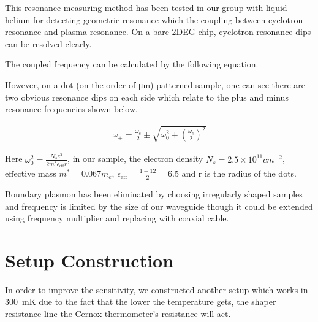 \documentclass[12pt]{ruthesis}
\begin{document}
This resonance measuring method has been tested in our group with liquid helium for detecting geometric resonance which the coupling between cyclotron resonance and plasma resonance. 
On a bare 2DEG chip, cyclotron resonance dips can be resolved clearly.

The coupled frequency can be calculated by the following equation. 


However, on a dot (on the order of \si{\micro\meter}) patterned sample, one can see there are two obvious resonance dips on each side which relate to the plus and minus resonance frequencies shown below.  


\begin{align}
\omega_{\pm}=\frac{\omega_{c}}{2} \pm \sqrt{ \omega_{0}^{2}+ \left(\frac{ \omega_{c} }{2}\right)^{2}}
\end{align}

Here $\displaystyle \omega_{0}^{2}=\frac{N_{s}e^{2}}{2m^{\ast}\epsilon_{\mathrm{eff}}r}$, in our sample, the electron density $N_{s}=2.5\times10^{11}cm^{-2}$, effective mass $m^{*}=0.067m_{e}$, $\epsilon_{\mathrm{eff}}=\frac{1+12}{2}=6.5$ and r is the radius of the dots.

Boundary plasmon has been eliminated by choosing irregularly shaped samples and frequency is limited by the size of our waveguide though it could be extended using frequency multiplier and replacing with coaxial cable. 

 
\section{Setup Construction}\label{Construction}

In order to improve the sensitivity, we constructed another setup which works in \SI{300}{\milli\kelvin} due to the fact that the lower the temperature gets, the shaper resistance line the Cernox thermometer's resistance will act.  
\end{document}
